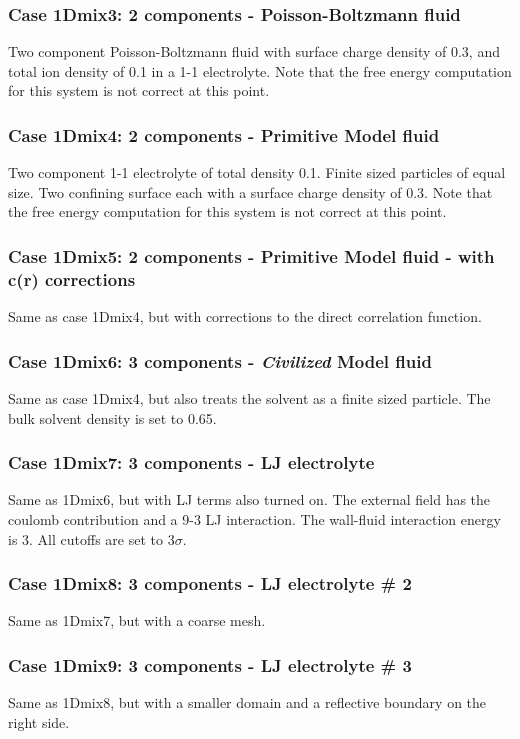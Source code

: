 \documentclass[10pt,onecolumn]{article}
\begin{document}
\subsubsection{Case 1Dmix3: 2 components - Poisson-Boltzmann fluid}
Two component Poisson-Boltzmann fluid with surface charge density of 0.3, and
total ion density of 0.1 in a 1-1 electrolyte.   Note that the free energy computation
for this system is not correct at this point.

\subsubsection{Case 1Dmix4: 2 components - Primitive Model fluid}
Two component 1-1 electrolyte of total density 0.1.  Finite sized particles of equal size.
Two confining surface each with a surface charge density of 0.3.   
Note that the free energy computation for this system is not correct at this point.

\subsubsection{Case 1Dmix5: 2 components - Primitive Model fluid - with c(r) corrections}
Same as case 1Dmix4, but with corrections to the direct correlation function.

\subsubsection{Case 1Dmix6: 3 components - {\it Civilized} Model fluid}
Same as case 1Dmix4, but also treats the solvent as a finite sized particle.
The bulk solvent density is set to 0.65.

\subsubsection{Case 1Dmix7: 3 components - LJ electrolyte}
Same as 1Dmix6, but with LJ terms also turned on.  The external field has the coulomb
contribution and a 9-3 LJ interaction.  The wall-fluid interaction energy is 3.  All
cutoffs are set to 3$\sigma$.

\subsubsection{Case 1Dmix8: 3 components - LJ electrolyte \# 2}
Same as 1Dmix7, but with a coarse mesh.

\subsubsection{Case 1Dmix9: 3 components - LJ electrolyte \# 3}
Same as 1Dmix8, but with a smaller domain and a reflective boundary
on the right side.
\end{document}
